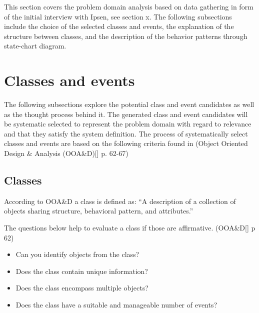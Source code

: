 This section covers the problem domain analysis based on data gathering in form of the initial interview with Ipsen, see section x.
The following subsections include the choice of the selected classes and events, the explanation of the structure between classes, and the description of the behavior patterns through state-chart diagram.

\section{Classes and events}
The following subsections explore the potential class and event candidates as well as the thought process behind it.
The generated class and event candidates will be systematic selected to represent the problem domain with regard to relevance and that they satisfy the system definition.
The process of systematically select classes and events are based on the following criteria found in (Object Oriented Design \& Analysis (OOA\&D)[] p. 62-67)

\subsection{Classes}
According to OOA\&D a class is defined as:
“A description of a collection of objects sharing structure, behavioral pattern, and attributes.”

The questions below help to evaluate a class if those are affirmative. (OOA\&D[] p 62)
\begin{itemize}
	\item Can you identify objects from the class?
	\item Does the class contain unique information?
	\item Does the class encompass multiple objects?
	\item Does the class have a suitable and manageable number of events?
\end{itemize}

